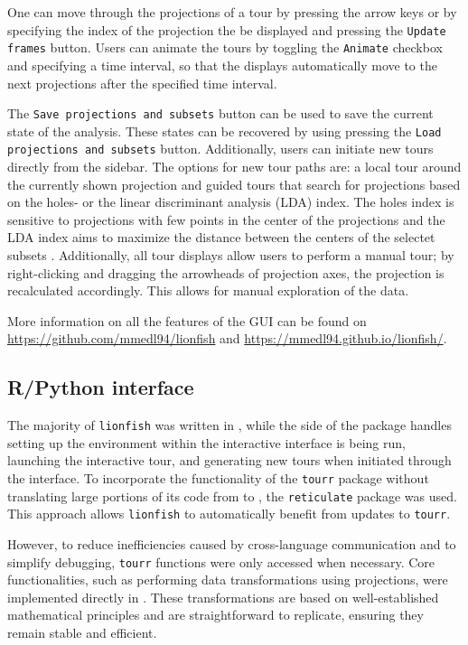 \documentclass[article]{ajs}
\begin{document}
One can move through the projections of a tour by pressing the arrow keys or by specifying the index of the projection the be displayed and pressing the \texttt{Update frames} button. Users can animate the tours by toggling the \texttt{Animate} checkbox and specifying a time interval, so that the displays automatically move to the next projections after the specified time interval.

The \texttt{Save projections and subsets} button can be used to save the current state of the analysis. These states can be recovered by using pressing the \texttt{Load projections and subsets} button. Additionally, users can initiate new tours directly from the sidebar. The options for new tour paths are: a local tour around the currently shown projection and guided tours that search for projections based on the holes- or the linear discriminant analysis (LDA) index. The holes index is sensitive to projections with few points in the center of the projections and the LDA index aims to maximize the distance between the centers of the selectet subsets \citep{ggobi}. Additionally, all tour displays allow users to perform a manual tour; by right-clicking and dragging the arrowheads of projection axes, the projection is recalculated accordingly. This allows for manual exploration of the data.

More information on all the features of the GUI can be found on \href{https://github.com/mmedl94/lionfish}{https://github.com/mmedl94/lionfish} and \href{https://mmedl94.github.io/lionfish/}{https://mmedl94.github.io/lionfish/}.

\subsection{R/Python interface}

The majority of \texttt{lionfish} was written in  \citep{python}, while the  \citep{R} side of the package handles setting up the  environment within the interactive interface is being run, launching the interactive tour, and generating new tours when initiated through the interface. To incorporate the functionality of the \texttt{tourr} package without translating large portions of its code from  to , the \texttt{reticulate} package was used. This approach allows \texttt{lionfish} to automatically benefit from updates to \texttt{tourr}.

However, to reduce inefficiencies caused by cross-language communication and to simplify debugging, \texttt{tourr} functions were only accessed when necessary. Core functionalities, such as performing data transformations using projections, were implemented directly in . These transformations are based on well-established mathematical principles and are straightforward to replicate, ensuring they remain stable and efficient.
\end{document}
